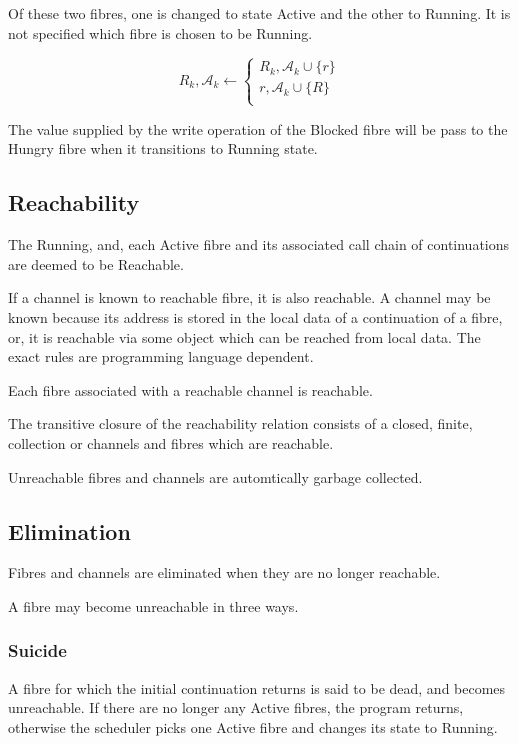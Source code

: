 \documentclass{article}
\begin{document}
\begin{enumerate}
Of these two
fibres, one is changed to state Active and the other to Running.
It is not specified which fibre is chosen to be Running.

\begin{equation}
R_k,{\mathcal A_k} \leftarrow
\begin{cases}
R_k,{\mathcal A_k} \cup \{r\} \\
r,{\mathcal A_k} \cup \{R\} \\
\end{cases}
\end{equation}


The value supplied by the write operation of the Blocked
fibre will be pass to the Hungry fibre when it transitions
to Running state.
\end{enumerate}

\subsection{Reachability}
The Running, and, each Active fibre and its associated call chain of 
continuations are deemed to be Reachable.

If a channel is known to reachable fibre, it is also reachable.
A channel may be known because its address is stored in the local
data of a continuation of a fibre, or, it is reachable via some object
which can be reached from local data. The exact rules are 
programming language dependent.

Each fibre associated with a reachable channel is reachable.

The transitive closure of the reachability relation consists
of a closed, finite, collection or channels and fibres which
are reachable.

Unreachable fibres and channels are automtically garbage
collected.

\subsection{Elimination}
Fibres and channels are eliminated when they are 
no longer reachable.

A fibre may become unreachable in three ways.

\subsubsection{Suicide}
A fibre for which the initial continuation returns is said to be
dead, and  becomes unreachable. If there are no longer any Active fibres,
the program returns, otherwise the scheduler picks
one Active fibre and changes its state to Running.
\end{document}
